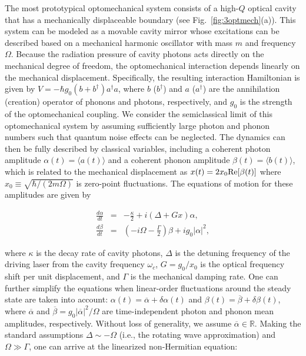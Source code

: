 \documentclass{tADP2e}
\theoremstyle{plain}
\newcommand{\eqn}[1]{
\begin{eqnarray}
	#1
\end{eqnarray}
}
\theoremstyle{plain}
\theoremstyle{definition}
\begin{document}
The most prototypical optomechanical system consists of a high-$Q$ optical cavity that has a mechanically displaceable boundary \cite{AM14} (see Fig.~\ref{fig:3optmech}(a)). This system can be modeled as a movable cavity mirror whose excitations can be described based on a mechanical harmonic oscillator with mass $m$ and frequency $\Omega$. Because the radiation pressure of cavity photons acts directly on the mechanical degree of freedom, the optomechanical interaction depends linearly on the mechanical displacement. Specifically, the resulting interaction Hamiltonian is given by $V=-\hbar g_0 (b+b^\dagger)a^\dagger a$, where $b$ ($b^\dagger$) and $a$ ($a^\dagger$) are the  annihilation (creation) operator of phonons and photons, respectively, and $g_0$ is the strength of the optomechanical coupling.
We consider the semiclassical limit of this optomechanical system by assuming sufficiently large photon and phonon numbers such that quantum noise effects can be neglected. The dynamics can then be fully described by classical variables, including a coherent photon amplitude $\alpha(t)=\langle a(t)\rangle$ and  a coherent phonon amplitude $\beta(t)=\langle b(t)\rangle$, which is related to the mechanical displacement as $x(t)=2x_0{\rm Re}[\beta(t)]$ where $x_0\equiv\sqrt{\hbar/(2m\Omega)}$ is zero-point fluctuations.  
The equations of motion for these amplitudes are given by
\eqn{\label{sec3optmech1}
\frac{d\alpha}{dt}&=&-\frac{\kappa}{2}+i\left(\Delta+Gx\right)\alpha,\\
\frac{d\beta}{dt}&=&\left(-i\Omega-\frac{\Gamma}{2}\right)\beta+ig_0\left|\alpha\right|^2,\label{sec3optmech2}
}
where $\kappa$ is the decay rate of cavity photons, $\Delta$ is the detuning frequency of the driving laser from the cavity frequency $\omega_c$, $G=g_0/x_0$ is the optical frequency shift per unit displacement,  and $\Gamma$ is the mechanical damping rate. One can further simplify the equations when linear-order fluctuations around the steady state are taken into account: $\alpha(t)=\overline{\alpha}+\delta\alpha(t)$ and $\beta(t)=\overline{\beta}+\delta\beta(t)$, where $\overline{\alpha}$ and $\overline{\beta}=g_0|\overline{\alpha}|^2/\Omega$ are time-independent photon and phonon mean amplitudes, respectively. Without loss of generality, we assume $\overline{\alpha}\in{\mathbb R}$. Making the standard assumptions $\Delta\sim -\Omega$ (i.e., the rotating wave approximation) and $\Omega\gg\Gamma$, one can arrive at the linearized non-Hermitian equation:
\end{document}
